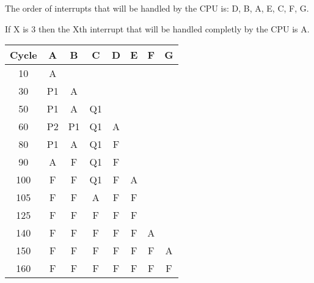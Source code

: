 The order of interrupts that will be handled by the CPU is: D, B, A, E, C, F, G.

If X is 3 then the Xth interrupt that will be handled completly by the CPU is A.

\begin{table}
    \centering
    \begin{tabular}{|c||c|c|c|c|c|c|c|}
        \hline
        \textbf{Cycle} & A & B & C & D & E & F & G \\ \hline
        10 & A & & & & & & \\ \hline
        30 & P1 & A & & & & & \\ \hline
        50 & P1 & A & Q1 & & & & \\ \hline
        60 & P2 & P1 & Q1 & A & & & \\ \hline
        80 & P1 & A & Q1 & F & & & \\ \hline
        90 & A & F & Q1 & F & & & \\ \hline
        100 & F & F & Q1 & F & A & & \\ \hline
        105 & F & F & A & F & F & & \\ \hline
        125 & F & F & F & F & F & & \\ \hline
        140 & F & F & F & F & F & A & \\ \hline
        150 & F & F & F & F & F & F & A \\ \hline
        160 & F & F & F & F & F & F & F \\ \hline
    \end{tabular}
\end{table}